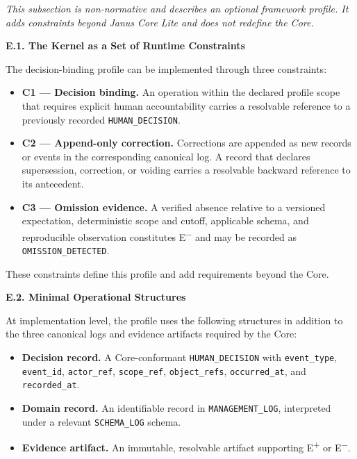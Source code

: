 \documentclass[conference]{IEEEtran}
\begin{document}
\emph{This subsection is non-normative and describes an optional framework
profile. It adds constraints beyond Janus Core Lite and does not redefine the
Core.}

\noindent\textbf{E.1. The Kernel as a Set of Runtime Constraints}

The decision-binding profile can be implemented through three constraints:

\begin{itemize}
  \item \textbf{C1 --- Decision binding.} An operation within the declared
  profile scope that requires explicit human accountability carries a resolvable
  reference to a previously recorded \texttt{HUMAN\_DECISION}.
  \item \textbf{C2 --- Append-only correction.} Corrections are appended as new
  records or events in the corresponding canonical log. A record that declares
  supersession, correction, or voiding carries a resolvable backward reference
  to its antecedent.
  \item \textbf{C3 --- Omission evidence.} A verified absence relative to a
  versioned expectation, deterministic scope and cutoff, applicable schema, and
  reproducible observation constitutes E\textsuperscript{$-$} and may be recorded
  as \texttt{OMISSION\_DETECTED}.
\end{itemize}

These constraints define this profile and add requirements beyond the Core.

\noindent\textbf{E.2. Minimal Operational Structures}

At implementation level, the profile uses the following structures in addition
to the three canonical logs and evidence artifacts required by the Core:

\begin{itemize}
  \item \textbf{Decision record.} A Core-conformant \texttt{HUMAN\_DECISION}
  with \texttt{event\_type}, \texttt{event\_id}, \texttt{actor\_ref},
  \texttt{scope\_ref}, \texttt{object\_refs}, \texttt{occurred\_at}, and
  \texttt{recorded\_at}.
  \item \textbf{Domain record.} An identifiable record in
  \texttt{MANAGEMENT\_LOG}, interpreted under a relevant \texttt{SCHEMA\_LOG}
  schema.
  \item \textbf{Evidence artifact.} An immutable, resolvable artifact supporting
  E\textsuperscript{+} or E\textsuperscript{$-$}.
\end{itemize}
\end{document}

